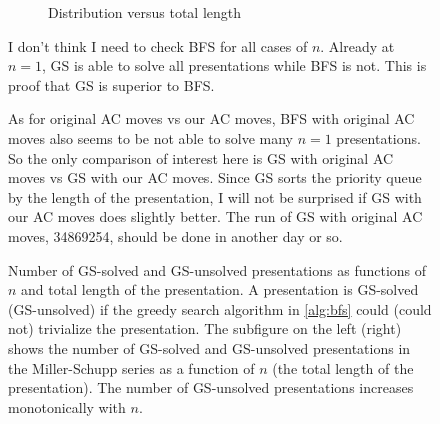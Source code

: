 \begin{figure}
\begin{subfigure}[b]{0.5\textwidth}
		\caption{Distribution versus total length}
		\label{fig:hist_vs_length}
	\end{subfigure}
	\caption{Number of GS-solved and GS-unsolved presentations as functions of $n$ and total length of the presentation. A presentation is GS-solved (GS-unsolved) if the greedy search algorithm in  \autoref{alg:bfs} could (could not) trivialize the presentation. The subfigure on the left (right) shows the number of GS-solved and GS-unsolved presentations in the Miller-Schupp series as a function of $n$ (the total length of the presentation). The number of GS-unsolved presentations increases monotonically with $n$. } \label{fig:miller_schupp_statistics}
	
I don't think I need to check BFS for all cases of $n$. Already at $n=1$, GS is able to solve all presentations while BFS is not. This is proof that GS is superior to BFS.



As for original AC moves vs our AC moves, BFS with original AC moves also seems to be not able to solve many $n=1$ presentations. So the only comparison of interest here is GS with original AC moves vs GS with our AC moves. Since GS sorts the priority queue by the length of the presentation, I will not be surprised if GS with our AC moves does slightly better. The run of GS with original AC moves,  34869254, should be done in another day or so.





\end{figure}